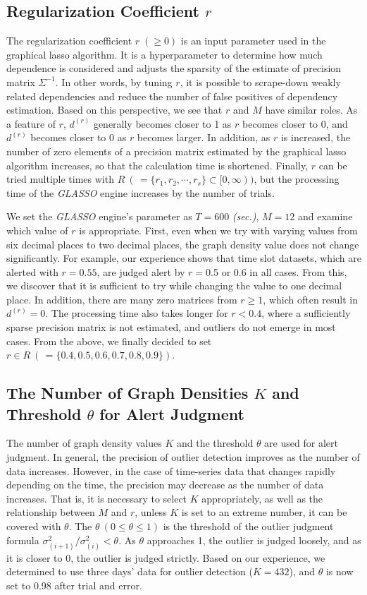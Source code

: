 \documentclass[conference]{IEEEtran}
\begin{document}
\subsection{Regularization Coefficient $r$}
The regularization coefficient $r\;(\geq 0)$ is an input parameter used in the graphical lasso algorithm.
It is a hyperparameter to determine how much dependence is considered and adjusts the sparsity of the estimate of precision matrix $\Sigma^{-1}$.
In other words, by tuning $r$, it is possible to scrape-down weakly related dependencies and reduce the number of false positives of dependency estimation.
Based on this perspective, we see that $r$ and $M$ have similar roles.
As a feature of $r$, $d^{(r)}$ generally becomes closer to 1 as $r$ becomes closer to 0, and $d^{(r)}$ becomes closer to 0 as $r$ becomes larger.
In addition, as $r$ is increased, the number of zero elements of a precision matrix estimated by the graphical lasso algorithm increases, so that the calculation time is shortened.
Finally, $r$ can be tried multiple times with $R \  ( \, = \{r_1, r_2, \cdots, r_s\}\subset [0,\infty))$, but the processing time of the \textit{GLASSO} engine increases by the number of trials.

We set the \textit{GLASSO} engine's parameter as $T=600$ \textit{(sec.)}, $M=12$ and examine which value of $r$ is appropriate.
First, even when we try with varying values from six decimal places to two decimal places, the graph density value does not change significantly.
For example, our experience shows that time slot datasets, which are alerted with $r=0.55$, are judged alert by $r=$0.5 or 0.6 in all cases.
From this, we discover that it is sufficient to try while changing the value to one decimal place.
In addition, there are many zero matrices from $r\geq 1$, which often result in $d^{(r)}=0$.
The processing time also takes longer for $r < 0.4$, where a sufficiently sparse precision matrix is not estimated, and outliers do not emerge in most cases.
From the above, we finally decided to set $r \in R \  ( \, = \{0.4, 0.5, 0.6, 0.7, 0.8, 0.9\})$.



\subsection{The Number of Graph Densities $K$ and Threshold $\theta$ for Alert Judgment}
The number of graph density values $K$ and the threshold $\theta$ are used for alert judgment.
In general, the precision of outlier detection improves as the number of data increases.
However, in the case of time-series data that changes rapidly depending on the time, the precision may decrease as the number of data increases.
That is, it is necessary to select $K$ appropriately, as well as the relationship between $M$ and $r$, unless $K$ is set to an extreme number, it can be covered with $\theta$.
The $\theta \  (0\leq \theta \leq 1)$ is the threshold of the outlier judgment formula $\sigma^{2}_{(i+1)}/\sigma^{2}_{(i)}<\theta$.
As $\theta$ approaches 1, the outlier is judged loosely, and as it is closer to 0, the outlier is judged strictly.
Based on our experience, we determined to use three days' data for outlier detection ($K=432$), and $\theta$ is now set to 0.98 after trial and error.
\end{document}
